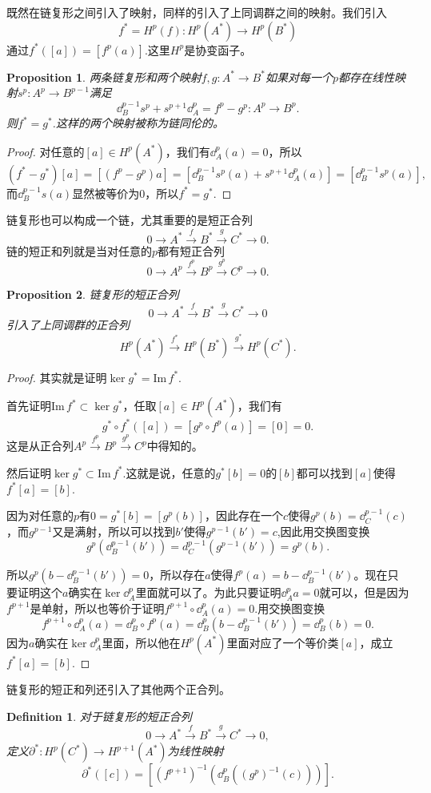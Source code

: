 \documentclass[11pt]{extbook}
\theoremstyle{plain}%
\newtheorem{pro}{Proposition}[section]%
\newtheorem{defi}{Definition}[section]%
\begin{document}
既然在链复形之间引入了映射，同样的引入了上同调群之间的映射。我们引入
\[
f^*=H^p(f):H^p(A^*)\to H^p(B^*)
\]
通过$f^*([a])=[f^p(a)]$.这里$H^p$是协变函子。
\begin{pro}
两条链复形和两个映射$f,g:A^*\to B^*$如果对每一个$p$都存在线性映射$s^p:A^p \to B^{p-1}$满足
\[
\dd_B^{p-1}s^p+s^{p+1}\dd_A^p=f^p-g^p:A^p\to B^p.
\]
则$f^*=g^*$.这样的两个映射被称为链同伦的。
\end{pro}
\begin{proof}
对任意的$[a]\in H^p(A^*)$，我们有$\dd_A^p(a)=0$，所以
\[
(f^*-g^*)[a]=[(f^p-g^p)a]=[\dd^{p-1}_Bs^p(a)+s^{p+1}\dd_A^p(a)]=[\dd^{p-1}_Bs^p(a)],
\]
而$\dd^{p-1}_Bs(a)$显然被等价为0，所以$f^*=g^*$.
\end{proof}
链复形也可以构成一个链，尤其重要的是短正合列
\[
0\to A^*\xrightarrow{f}B^*\xrightarrow{g}C^*\to 0.
\]
链的短正和列就是当对任意的$p$都有短正合列
\[
0\to A^p\xrightarrow{f^p}B^p\xrightarrow{g^p}C^p\to 0.
\]
\begin{pro}
链复形的短正合列
\[
0\to A^*\xrightarrow{f}B^*\xrightarrow{g}C^*\to 0
\]
引入了上同调群的正合列
\[
H^p(A^*)\xrightarrow{f^*}H^p(B^*)\xrightarrow{g^*}H^p(C^*).
\]
\end{pro}
\begin{proof}
其实就是证明$\ker g^*=\mathrm{Im}\, f^*$.

首先证明$\mathrm{Im}\, f^* \subset \ker g^*$，任取$[a]\in H^p(A^*)$，我们有
\[
g^*\circ f^*([a])=[g^p\circ f^p(a)]=[0]=0.
\]
这是从正合列$A^p\xrightarrow{f^p}B^p\xrightarrow{g^p}C^p$中得知的。

然后证明$\ker g^*\subset \mathrm{Im}\, f^*$.这就是说，任意的$g^*[b]=0$的$[b]$都可以找到$[a]$使得$f^*[a]=[b]$.

因为对任意的$p$有$0=g^*[b]=[g^p(b)]$，因此存在一个$c$使得$g^p(b)=\dd^{p-1}_C(c)$，而$g^{p-1}$又是满射，所以可以找到$b'$使得$g^{p-1}(b')=c$,因此用交换图变换
\[
g^p(\dd^{p-1}_B(b'))=d^{p-1}_C(g^{p-1}(b'))=g^p(b).
\]

所以$g^p(b-\dd^{p-1}_B(b'))=0$，所以存在$a$使得$f^p(a)=b-\dd^{p-1}_B(b')$。现在只要证明这个$a$确实在$\ker \dd^p_A$里面就可以了。为此只要证明$\dd^p_A a=0$就可以，但是因为$f^{p+1}$是单射，所以也等价于证明$f^{p+1}\circ \dd^p_A (a)=0$.用交换图变换
\[
f^{p+1}\circ \dd^p_A (a)=\dd^p_B\circ f^p (a)=\dd^p_B(b-\dd^{p-1}_B(b'))=\dd^p_B(b)=0.
\]
因为$a$确实在$\ker \dd^p_A$里面，所以他在$H^p(A^*)$里面对应了一个等价类$[a]$，成立$f^*[a]=[b]$.
\end{proof}
链复形的短正和列还引入了其他两个正合列。
\begin{defi}
对于链复形的短正合列
\[
0\to A^*\xrightarrow{f}B^*\xrightarrow{g}C^*\to 0,
\]
定义$\partial^*:H^p(C^*)\to H^{p+1}(A^*)$为线性映射
\[
\partial^*([c])=\left[(f^{p+1})^{-1}\left(\dd^p_B\left((g^p)^{-1}(c)\right)\right)\right].
\]
\end{defi}
\end{document}

